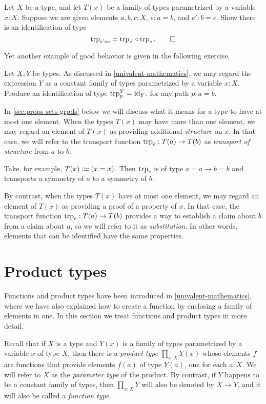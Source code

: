 \begin{xca}\label{xca:trp-compose}
  Let $X$ be a type, and let $T(x)$ be a family of types parametrized by a variable $x:X$.
  Suppose we are given elements $a,b,c:X$, $e:a=b$, and $e':b=c$. Show there is an identification of type
  \[
    \trp {e'\circ e} = \trp {e'} \circ \trp {e}.\qedhere
  \]
\end{xca}

Yet another example of good behavior is given in the following exercise.

\begin{xca}\label{xca:trp-nondep}
  Let $X,Y$ be types.
  As discussed in \cref{univalent-mathematics}, we may regard the expression $Y$ as a constant family of types parametrized by a variable $x:X$.
  Produce an identification of type $\trp[Y]{p} = \id_Y$, for any path $p:a=b$.
\end{xca}

In \cref{sec:props-sets-grpds} below we will discuss what it means for a type to have at most one element.
When the types $T(x)$ may have more than one element,
we may regard an element of $T(x)$ as providing additional \emph{structure} on $x$.
In that case, we will refer to the transport function $\trp e : T(a) \to T(b)$ as
\emph{transport of structure} from $a$ to $b$.

Take, for example, $T(x)\defeq (x=x)$.
Then $\trp e$ is of type $a=a \to b=b$ and transports a
symmetry of $a$ to a symmetry of $b$.

By contrast, when the types
$T(x)$ have at most one element, we may regard an element of $T(x)$
as providing a proof of a property of $x$. In that case, the transport
function $\trp e : T(a) \to T(b)$ provides a way to establish a claim about $b$
from a claim about $a$, so we will refer to it as \emph{substitution}.  In
other words, elements that can be identified have the same properties.


\section{Product types}
\label{sec:product-types}

Functions and product types have been introduced in \cref{univalent-mathematics}, where we have also explained how to create a function by
enclosing a family of elements in one.  In this section we treat functions and product types in more detail.

Recall that if $X$ is a type and $Y(x)$ is a family of types parametrized by a variable $x$ of type $X$, then there is a \emph{product type}
$\prod_{x:X} Y(x)$ whose elements $f$ are functions that provide elements $f(a)$ of type $Y(a)$, one for each $a:X$.  We will refer to $X$ as the
\emph{parameter type} of the product. By contrast, if $Y$ happens to be a constant family of types, then
$\prod_{x:X} Y$ will also be denoted by $X \to Y$, and it will also be called a \emph{function type}.

